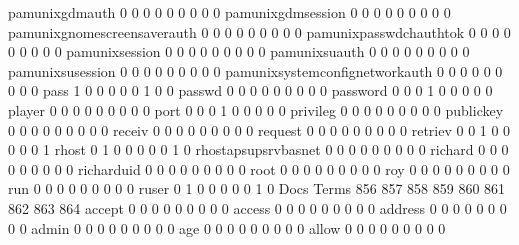 \documentclass[compress,8pt]{beamer}
\begin{document}
\begin{frame}
\begin{Schunk}
  pamunixgdmauth                             0   0   0   0   0   0   0   0   0
  pamunixgdmsession                          0   0   0   0   0   0   0   0   0
  pamunixgnomescreensaverauth                0   0   0   0   0   0   0   0   0
  pamunixpasswdchauthtok                     0   0   0   0   0   0   0   0   0
  pamunixsession                             0   0   0   0   0   0   0   0   0
  pamunixsuauth                              0   0   0   0   0   0   0   0   0
  pamunixsusession                           0   0   0   0   0   0   0   0   0
  pamunixsystemconfignetworkauth             0   0   0   0   0   0   0   0   0
  pass                                       1   0   0   0   0   0   1   0   0
  passwd                                     0   0   0   0   0   0   0   0   0
  password                                   0   0   0   1   0   0   0   0   0
  player                                     0   0   0   0   0   0   0   0   0
  port                                       0   0   0   1   0   0   0   0   0
  privileg                                   0   0   0   0   0   0   0   0   0
  publickey                                  0   0   0   0   0   0   0   0   0
  receiv                                     0   0   0   0   0   0   0   0   0
  request                                    0   0   0   0   0   0   0   0   0
  retriev                                    0   0   1   0   0   0   0   0   1
  rhost                                      0   1   0   0   0   0   0   1   0
  rhostapsupsrvbasnet                        0   0   0   0   0   0   0   0   0
  richard                                    0   0   0   0   0   0   0   0   0
  richarduid                                 0   0   0   0   0   0   0   0   0
  root                                       0   0   0   0   0   0   0   0   0
  roy                                        0   0   0   0   0   0   0   0   0
  run                                        0   0   0   0   0   0   0   0   0
  ruser                                      0   1   0   0   0   0   0   1   0
                                          Docs
Terms                                      856 857 858 859 860 861 862 863 864
  accept                                     0   0   0   0   0   0   0   0   0
  access                                     0   0   0   0   0   0   0   0   0
  address                                    0   0   0   0   0   0   0   0   0
  admin                                      0   0   0   0   0   0   0   0   0
  age                                        0   0   0   0   0   0   0   0   0
  allow                                      0   0   0   0   0   0   0   0   0

\end{Schunk}
\end{frame}
\end{document}
